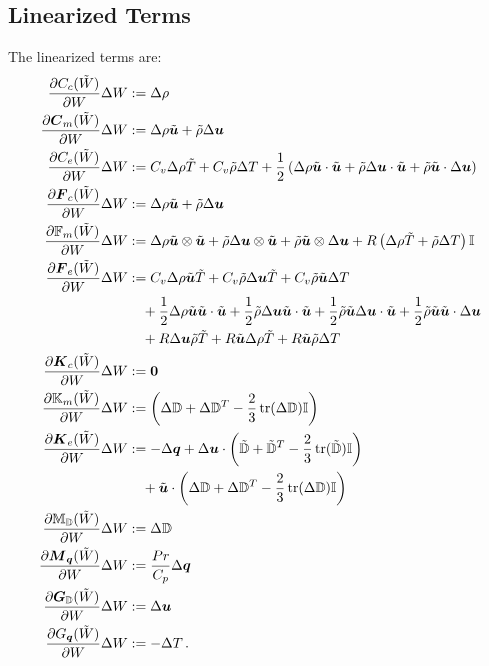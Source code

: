 \documentclass[Dissertation.tex]{subfiles}
\begin{document}
\subsection{Linearized Terms}
The linearized terms are:
\begin{align*}
\frac{\partial C_c(\tilde W)}{\partial W}\Delta W&:=
	\Delta\rho\\
\frac{\partial\boldsymbol C_m(\tilde W)}{\partial W}\Delta W&:=
	\Delta\rho\tilde{\boldsymbol u}+\tilde\rho\Delta\boldsymbol u\\
\frac{\partial C_e(\tilde W)}{\partial W}\Delta W&:=
	C_v\Delta\rho\tilde T+C_v\tilde\rho\Delta T
	+\frac{1}{2}\left( \Delta\rho\tilde{\boldsymbol u}\cdot\tilde{\boldsymbol u}+\tilde\rho\Delta\boldsymbol u\cdot\tilde{\boldsymbol u}+\tilde\rho\tilde{\boldsymbol u}\cdot\Delta\boldsymbol u \right)\\
\frac{\partial\boldsymbol F_c(\tilde W)}{\partial W}\Delta W&:=
	\Delta\rho\tilde{\boldsymbol u}+\tilde\rho\Delta\boldsymbol u\\
\frac{\partial\mathbb{F}_m(\tilde W)}{\partial W}\Delta W&:=
	\Delta\rho\tilde{\boldsymbol u}\otimes\tilde{\boldsymbol u}
	+\tilde\rho\Delta\boldsymbol u\otimes\tilde{\boldsymbol u}
	+\tilde\rho\tilde{\boldsymbol u}\otimes\Delta\boldsymbol u
	+R\left( \Delta\rho\tilde T+\tilde\rho\Delta T \right)\mathbb{I}\\
\frac{\partial\boldsymbol F_e(\tilde W)}{\partial W}\Delta W&:=
	C_v\Delta\rho\tilde{\boldsymbol u}\tilde T+C_v\tilde\rho\Delta\boldsymbol u\tilde T+C_v\tilde\rho\tilde{\boldsymbol u}\Delta T
	\\&\quad
	+\frac{1}{2}\Delta\rho\tilde{\boldsymbol u}\tilde{\boldsymbol u}\cdot\tilde{\boldsymbol u}
	+\frac{1}{2}\tilde\rho\Delta\boldsymbol u\tilde{\boldsymbol u}\cdot\tilde{\boldsymbol u}
	+\frac{1}{2}\tilde\rho\tilde{\boldsymbol u}\Delta\boldsymbol u\cdot\tilde{\boldsymbol u}
	+\frac{1}{2}\tilde\rho\tilde{\boldsymbol u}\tilde{\boldsymbol u}\cdot\Delta\boldsymbol u
	\\&\quad
	+R\Delta\boldsymbol u\tilde\rho\tilde T
	+R\tilde{\boldsymbol u}\Delta\rho\tilde T
	+R\tilde{\boldsymbol u}\tilde\rho\Delta T\\
\frac{\partial\boldsymbol K_c(\tilde W)}{\partial W}\Delta W&:=
	\boldsymbol 0\\
\frac{\partial\mathbb{K}_m(\tilde W)}{\partial W}\Delta W&:=
	\left( \Delta\mathbb{D}+\Delta\mathbb{D}^T-\frac{2}{3}\operatorname*{tr}(\Delta\mathbb{D})\mathbb{I} \right)\\
\frac{\partial\boldsymbol K_e(\tilde W)}{\partial W}\Delta W&:=
	-\Delta\boldsymbol q+\Delta\boldsymbol u\cdot\left( \tilde{\mathbb{D}}+\tilde{\mathbb{D}}^T-\frac{2}{3}\operatorname*{tr}(\tilde{\mathbb{D}})\mathbb{I} \right)
	\\&\quad
	+\tilde{\boldsymbol u}\cdot\left( \Delta\mathbb{D}+\Delta\mathbb{D}^T-\frac{2}{3}\operatorname*{tr}(\Delta\mathbb{D})\mathbb{I} \right)\\
\frac{\partial\mathbb{M}_{\mathbb{D}}(\tilde W)}{\partial W}\Delta W&:=
	\Delta\mathbb{D}\\
\frac{\partial\boldsymbol M_{\boldsymbol q}(\tilde W)}{\partial W}\Delta W&:=
	\frac{Pr}{C_p}\Delta\boldsymbol q\\
\frac{\partial\boldsymbol G_{\mathbb{D}}(\tilde W)}{\partial W}\Delta W&:=
	\Delta\boldsymbol u\\
\frac{\partial G_{\boldsymbol q}(\tilde W)}{\partial W}\Delta W&:=
	-\Delta T\,.
\end{align*}
\end{document}
